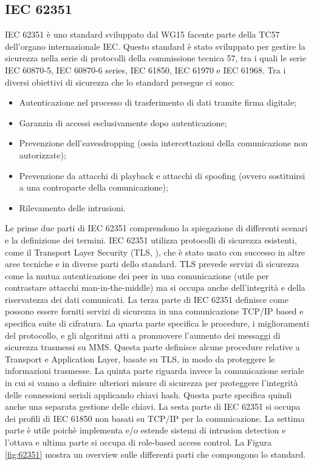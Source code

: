 \subsection{IEC 62351}
IEC 62351 è uno standard sviluppato dal WG15 facente parte della TC57 dell'organo internazionale IEC. Questo standard è stato sviluppato per gestire la sicurezza nella serie di protocolli della commissione tecnica 57, tra i quali le serie IEC 60870-5, IEC 60870-6 series, IEC 61850, IEC 61970 e IEC 61968. Tra i diversi obiettivi di sicurezza che lo standard persegue ci sono:
\begin{itemize}
	\item Autenticazione nel processo di trasferimento di dati tramite firma digitale;
	\item Garanzia di accessi esclusivamente dopo autenticazione;
	\item Prevenzione dell'eavesdropping (ossia intercettazioni della comunicazione non autorizzate);
	\item Prevenzione da attacchi di playback e attacchi di spoofing (ovvero sostituirsi a una controparte della comunicazione);
	\item Rilevamento delle intrusioni.
\end{itemize}
Le prime due parti di IEC 62351 comprendono la spiegazione di differenti scenari e la definizione dei termini. IEC 62351 utilizza protocolli di sicurezza esistenti, come il Transport Layer Security (TLS, \cite{tls}), che è stato usato con successo in altre aree tecniche e in diverse parti dello standard. TLS prevede servizi di sicurezza come la mutua autenticazione dei peer in una comunicazione (utile per contrastare attacchi man-in-the-middle) ma si occupa anche dell'integrità e della riservatezza dei dati comunicati. La terza parte di IEC 62351 definisce come possono essere forniti servizi di sicurezza in una  comunicazione TCP/IP based e specifica suite di cifratura. La quarta parte specifica le procedure, i miglioramenti del protocollo, e gli algoritmi atti a promuovere l'aumento dei messaggi di sicurezza trasmessi su MMS. Questa parte definisce alcune procedure relative a Transport e Application Layer, basate su TLS, in modo da proteggere le informazioni trasmesse. La quinta parte riguarda invece la comunicazione seriale in cui si vanno a definire ulteriori misure di sicurezza per proteggere l'integrità delle connessioni seriali applicando chiavi hash. Questa parte specifica quindi anche una separata gestione delle chiavi. La sesta parte di IEC 62351 si occupa dei profili di IEC 61850 non basati su TCP/IP per la comunicazione. La settima parte è utile poichè implementa e/o estende sistemi di intrusion detection e l'ottava e ultima parte si occupa di role-based access control. La Figura \ref{fig:62351} mostra un overview sulle differenti parti che compongono lo standard.
